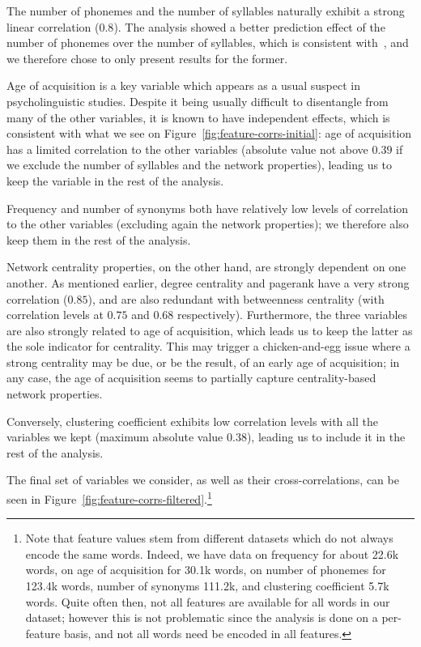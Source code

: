 The number of phonemes and the number of syllables naturally exhibit a strong linear correlation ($0.8$).
The analysis showed a better prediction effect of the number of phonemes over the number of syllables, which is consistent with~\citet{nick-diss}, and we therefore chose to only present results for the former.

Age of acquisition is a key variable which appears as a usual suspect in psycholinguistic studies.
Despite it being usually difficult to disentangle from many of the other variables, it is known to have independent effects, which is consistent with what we see on Figure~\ref{fig:feature-corrs-initial}: age of acquisition has a limited correlation to the other variables (absolute value not above $0.39$ if we exclude the number of syllables and the network properties), leading us to keep the variable in the rest of the analysis.

Frequency and number of synonyms both have relatively low levels of correlation to the other variables (excluding again the network properties); we therefore also keep them in the rest of the analysis.

\bigskip
Network centrality properties, on the other hand, are strongly dependent on one another.
As mentioned earlier, degree centrality and pagerank have a very strong correlation ($0.85$), and are also redundant with betweenness centrality (with correlation levels at $0.75$ and $0.68$ respectively).
Furthermore, the three variables are also strongly related to age of acquisition, which leads us to keep the latter as the sole indicator for centrality. This may trigger a chicken-and-egg issue where a strong centrality may be due, or be the result, of an early age of acquisition; in any case, the age of acquisition seems to partially capture centrality-based network properties.

Conversely, clustering coefficient exhibits low correlation levels with all the variables we kept (maximum absolute value $0.38$), leading us to include it in the rest of the analysis.

The final set of variables we consider, as well as their cross-correlations, can be seen in Figure~\ref{fig:feature-corrs-filtered}.\footnote{Note that feature values stem from different datasets which do not always encode the same words.
Indeed, we have data on frequency for about 22.6k words, on age of acquisition for 30.1k words, on number of phonemes for 123.4k words, number of synonyms 111.2k, and clustering coefficient 5.7k words.
Quite often then, not all features are available for all words in our dataset; %
however this is not problematic since the analysis is done on a per-feature basis, and not all words need be encoded in all features.}

